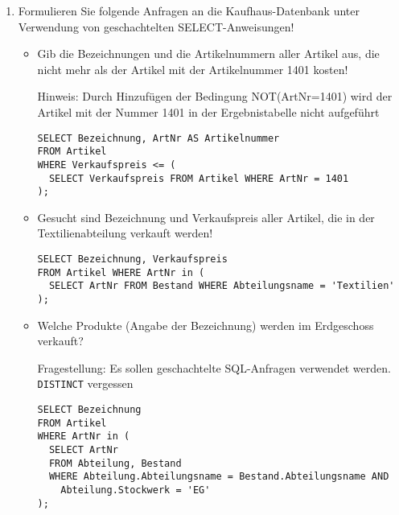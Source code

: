\documentclass{lehramt-informatik-aufgabe}
\begin{document}
\begin{enumerate}
\begin{itemize}
\end{itemize}


\item Formulieren Sie folgende Anfragen an die Kaufhaus-Datenbank unter
Verwendung von geschachtelten SELECT-Anweisungen!

\begin{itemize}


\item Gib die Bezeichnungen und die Artikelnummern aller Artikel aus,
die nicht mehr als der Artikel mit der Artikelnummer 1401 kosten!

\begin{antwort}[muster]
Hinweis: Durch Hinzufügen der Bedingung NOT(ArtNr=1401) wird der Artikel
mit der Nummer 1401 in der Ergebnistabelle nicht aufgeführt
\begin{verbatim}
SELECT Bezeichnung, ArtNr AS Artikelnummer
FROM Artikel
WHERE Verkaufspreis <= (
  SELECT Verkaufspreis FROM Artikel WHERE ArtNr = 1401
);
\end{verbatim}
\end{antwort}


\item Gesucht sind Bezeichnung und Verkaufspreis aller Artikel, die in
der Textilienabteilung verkauft werden!

\begin{antwort}[muster]
\begin{verbatim}
SELECT Bezeichnung, Verkaufspreis
FROM Artikel WHERE ArtNr in (
  SELECT ArtNr FROM Bestand WHERE Abteilungsname = 'Textilien'
);
\end{verbatim}
\end{antwort}


\item Welche Produkte (Angabe der Bezeichnung) werden im Erdgeschoss
verkauft?

\begin{antwort}[falsch]
Fragestellung: Es sollen geschachtelte SQL-Anfragen verwendet werden.
\verb|DISTINCT| vergessen
\begin{verbatim}
SELECT Bezeichnung
FROM Artikel
WHERE ArtNr in (
  SELECT ArtNr
  FROM Abteilung, Bestand
  WHERE Abteilung.Abteilungsname = Bestand.Abteilungsname AND
    Abteilung.Stockwerk = 'EG'
);
\end{verbatim}
\end{antwort}


\end{itemize}
\end{enumerate}
\end{document}
